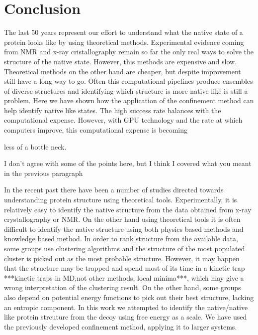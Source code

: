 \documentclass[12pt]{article}
\newcommand{\Alberto}[1]{\color{ForestGreen}#1\normalcolor }
\begin{document}
\section{Conclusion}


The last 50 years represent our effort to understand what the native state of a protein
    looks like by using theoretical methods. Experimental evidence coming from NMR and x-ray
    cristallography remain so far the only real ways to solve the structure of the native state.
    However, this methods are expensive and slow. Theoretical methods on the other hand are cheaper,
    but despite improvement still have a long way to go. Often this computational pipelines produce
    ensembles of diverse structures and identifying which structure is more native like is still a
    problem. Here we have shown how the application of the confinement method can help identify
    native like states. The high success rate balances with the computational expense. However, with
    GPU technology and the rate at which computers improve, this computational expense is becoming

less of a bottle neck.

\Alberto{I don't agree with some of the points here, but I think I covered what you meant in the
previous paragraph}

In the recent past there have been a number of studies directed towards understanding protein
structure using theoretical tools. Experimentally, it is relatively easy to identify the native
structure from the data obtained from x-ray crystallography or NMR. On the other hand using
theoretical tools it is often difficult to identify the native structure using both physics based
methods and knowledge based method. In order to rank structure from the available data, some groups
use clustering algorithms and the structure of the most populated cluster is picked out as the most
probable structure. However, it may happen that the structure may be trapped and spend most of its
time in a kinetic trap ***kinetic traps in MD,not other methods, local minima***, which may give a
wrong interpretation of the clustering result. On the other hand, some groups also depend on
potential energy functions to pick out their best structure, lacking an entropic component. In this
work we attempted to identify the native/native like protein strcuture from the decoy using free
energy as a scale. We have used the previously developed confinement method, applying it to larger
systems.
\end{document}
